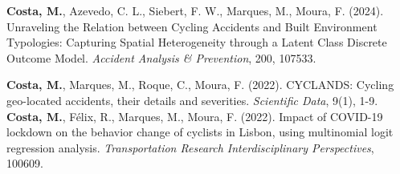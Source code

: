 

\cvsubsection{}
\begin{cvpublications}
	\cvpublication{}
\end{cvpublications}


\begin{cvpublications}
  \cvpublication
    {\textbf{Costa, M.}, Azevedo, C. L., Siebert, F. W., Marques, M., Moura, F. (2024). Unraveling the Relation between Cycling Accidents and Built Environment Typologies: Capturing Spatial Heterogeneity through a Latent Class Discrete Outcome Model. \textit{Accident Analysis \& Prevention}, 200, 107533.}

\end{cvpublications}

\begin{cvpublications}
  \cvpublication
    {\textbf{Costa, M.}, Marques, M., Roque, C., Moura, F. (2022). CYCLANDS: Cycling geo-located accidents, their details and severities. \textit{Scientific Data}, 9(1), 1-9.}
  \cvpublication
    {\textbf{Costa, M.}, Félix, R., Marques, M., Moura, F. (2022). Impact of COVID-19 lockdown on the behavior change of cyclists in Lisbon, using multinomial logit regression analysis. \textit{Transportation Research Interdisciplinary Perspectives}, 100609.}

\end{cvpublications}


